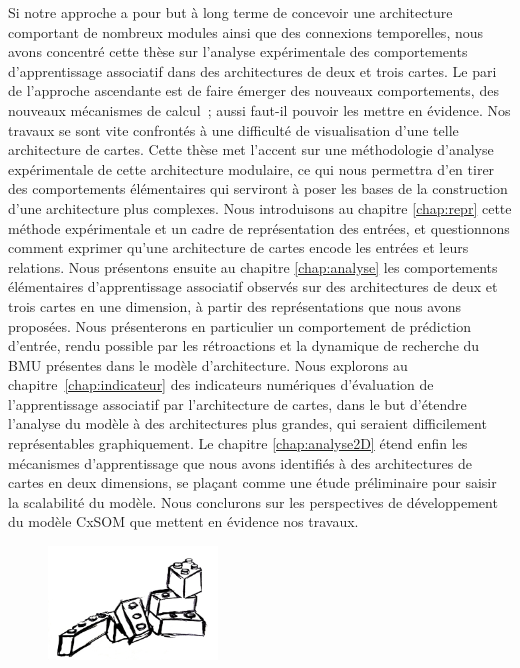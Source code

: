 Si notre approche a pour but à long terme de concevoir une architecture comportant de nombreux modules ainsi que des connexions temporelles, nous avons concentré cette thèse sur l'analyse expérimentale des comportements d'apprentissage associatif dans des architectures de deux et trois cartes.
Le pari de l'approche ascendante est de faire émerger des nouveaux comportements, des nouveaux mécanismes de calcul~; aussi faut-il pouvoir les mettre en évidence. Nos travaux se sont vite confrontés à une difficulté de visualisation d'une telle architecture de cartes. Cette thèse met l'accent sur une méthodologie d'analyse expérimentale de cette architecture modulaire, ce qui nous permettra d'en tirer des comportements élémentaires qui serviront à poser les bases de la construction d'une architecture plus complexes.
Nous introduisons au chapitre \ref{chap:repr} cette méthode expérimentale et un cadre de représentation des entrées, et questionnons comment exprimer qu'une architecture de cartes encode les entrées et leurs relations.
Nous présentons ensuite au chapitre \ref{chap:analyse} les comportements élémentaires d'apprentissage associatif observés sur des architectures de deux et trois cartes en une dimension, à partir des représentations que nous avons proposées. Nous présenterons en particulier un comportement de prédiction d'entrée, rendu possible par les rétroactions et la dynamique de recherche du BMU présentes dans le modèle d'architecture.
Nous explorons au chapitre~\ref{chap:indicateur} des indicateurs numériques d'évaluation de l'apprentissage associatif par l'architecture de cartes, dans le but d'étendre l'analyse du modèle à des architectures plus grandes, qui seraient difficilement représentables graphiquement.
Le chapitre \ref{chap:analyse2D} étend enfin les mécanismes d'apprentissage que nous avons identifiés à des architectures de cartes en deux dimensions, se plaçant comme une étude préliminaire pour saisir la scalabilité du modèle.
Nous conclurons sur les perspectives de développement du modèle CxSOM que mettent en évidence nos travaux.

    \begin{figure}[b]
        \vspace{1cm}
        \centering\includegraphics[width=0.4\textwidth]{lego2.jpg}
        \vspace{1cm}
    \end{figure}

